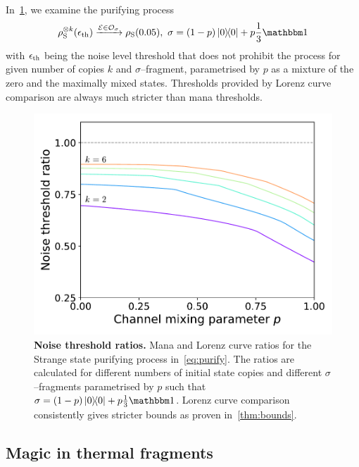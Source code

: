 \documentclass[pra,
aps,
twocolumn,
superscriptaddress,
groupedaddress,
nofootinbib,
reprint
]{revtex4-1}
\begin{document}
In~\cref{fig:distill}, we examine the purifying process 
\begin{equation}\label{eq:purify}
    \rho_{\rm{S}}^{\otimes k}(\epsilon_{\rm{th}}) \xrightarrow{\E \in \O_\sigma} \rho_{\rm{S}}(0.05),\ \sigma = (1-p)\ketbra{0} + p \frac{1}{3}\id
\end{equation}
with $\epsilon_{\rm{th}}$ being the noise level threshold that does not prohibit the process for given number of copies $k$ and $\sigma$--fragment, parametrised by $p$ as a mixture of the zero and the maximally mixed states.
Thresholds provided by Lorenz curve comparison are always much stricter than mana thresholds.
\begin{figure}
    \centering
    \includegraphics[scale=0.5]{figs/ratios.pdf}
    \caption{\textbf{Noise threshold ratios.} Mana and Lorenz curve ratios for the Strange state purifying process in~\cref{eq:purify}.
    The ratios are calculated for different numbers of initial state copies and different $\sigma$--fragments parametrised by $p$ such that $\sigma = (1-p)\ketbra{0} + p \frac{1}{3}\id$.
    Lorenz curve comparison consistently gives stricter bounds as proven in~\cref{thm:bounds}.
    }
    \label{fig:distill}
\end{figure}

\subsection{Magic in thermal fragments}\label{sec:thermal}
\end{document}
